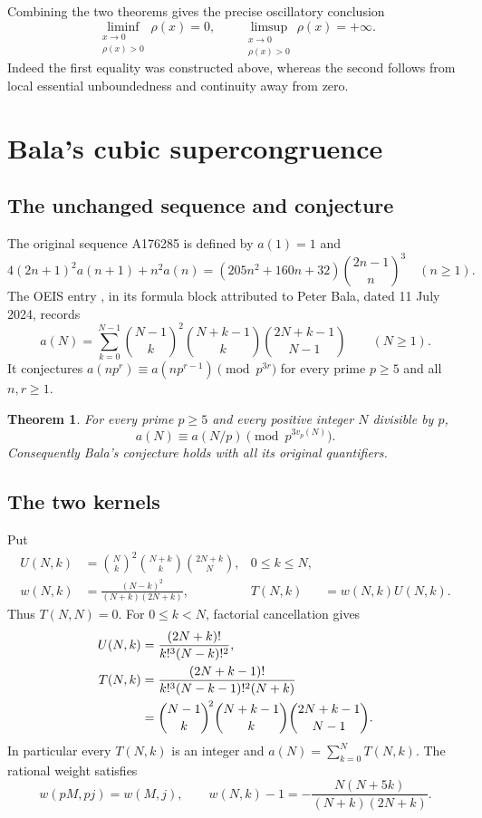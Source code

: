 \documentclass[11pt,a4paper]{article}
\newtheorem{theorem}{Theorem}[section]
\newcommand{\vp}{v_p}
\numberwithin{equation}{section}
\begin{document}
Combining the two theorems gives the precise oscillatory conclusion
\[
 \liminf_{\substack{x\to0\\\rho(x)>0}}\rho(x)=0,
 \qquad
 \limsup_{\substack{x\to0\\\rho(x)>0}}\rho(x)=+\infty.
\]
Indeed the first equality was constructed above, whereas the second
follows from local essential unboundedness and continuity away from zero.



\section{Bala's cubic supercongruence}\label{sec:bala}\subsection{The unchanged sequence and conjecture}
The original sequence A176285 is defined by $a(1)=1$ and
\begin{equation}\label{original}
4(2n+1)^2a(n+1)+n^2a(n)
=(205n^2+160n+32)\binom{2n-1}{n}^{\!3}\quad(n\ge1).
\end{equation}
The OEIS entry \cite{OEIS}, in its formula block attributed to Peter Bala, dated 11 July 2024, records
\begin{equation}\label{def}
 a(N)=\sum_{k=0}^{N-1}
 \binom{N-1}{k}^{\!2}\binom{N+k-1}{k}
 \binom{2N+k-1}{N-1}\qquad(N\ge1).
\end{equation}
It conjectures $a(np^r)\equiv a(np^{r-1})\pmod{p^{3r}}$ for every
prime $p\ge5$ and all $n,r\ge1$.

\begin{theorem}\label{main}
For every prime $p\ge5$ and every positive integer $N$ divisible by $p$,
\[
 a(N)\equiv a(N/p)\pmod{p^{3\vp(N)}}.
\]
Consequently Bala's conjecture holds with all its original quantifiers.
\end{theorem}

\subsection{The two kernels}
Put
\begin{align*}
 U(N,k)&=\binom Nk^{\!2}\binom{N+k}{k}\binom{2N+k}{N},
 &0\le k\le N,\\
 w(N,k)&=\frac{(N-k)^2}{(N+k)(2N+k)},
 &T(N,k)&=w(N,k)U(N,k).
\end{align*}
Thus $T(N,N)=0$. For $0\le k<N$, factorial cancellation gives
\begin{align}
 U(N,k)&=\frac{(2N+k)!}{k!^3(N-k)!^2},\label{Ufact}\\
 T(N,k)&=\frac{(2N+k-1)!}{k!^3(N-k-1)!^2(N+k)}\notag\\
 &=\binom{N-1}{k}^{\!2}\binom{N+k-1}{k}
   \binom{2N+k-1}{N-1}.\label{Tintegral}
\end{align}
In particular every $T(N,k)$ is an integer and
$a(N)=\sum_{k=0}^NT(N,k)$. The rational weight satisfies
\begin{equation}\label{weight}
 w(pM,pj)=w(M,j),\qquad
 w(N,k)-1=-\frac{N(N+5k)}{(N+k)(2N+k)}.
\end{equation}
\end{document}
